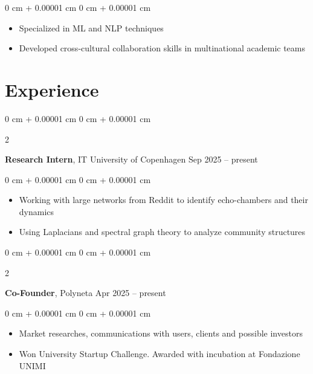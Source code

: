 \documentclass[10pt, letterpaper]{article}
\newenvironment{highlights}{
    \begin{itemize}[
        topsep=0.10 cm,
        parsep=0.10 cm,
        partopsep=0pt,
        itemsep=0pt,
        leftmargin=0 cm + 10pt
    ]
}{
    \end{itemize}
} %
\newenvironment{onecolentry}{
    \begin{adjustwidth}{
        0 cm + 0.00001 cm
    }{
        0 cm + 0.00001 cm
    }
}{
    \end{adjustwidth}
} %
\newenvironment{twocolentry}[2][]{
    \onecolentry
    \def\secondColumn{#2}
    \setcolumnwidth{\fill, 4.5 cm}
    \begin{paracol}{2}
}{
    \switchcolumn \raggedleft \secondColumn
    \end{paracol}
    \endonecolentry
} %
\begin{document}
        \vspace{0.10 cm}
        \begin{onecolentry}
            \begin{highlights}
                \item Specialized in ML and NLP techniques
                \item Developed cross-cultural collaboration skills in multinational academic teams
            \end{highlights}
        \end{onecolentry}
    
    \section{Experience}
        
        \begin{twocolentry}{
            Sep 2025 – present
        }
        \textbf{Research Intern}, IT University of Copenhagen\end{twocolentry}

        \vspace{0.10 cm}
        \begin{onecolentry}
            \begin{highlights}
                \item Working with large networks from Reddit to identify echo-chambers and their dynamics
                \item Using Laplacians and spectral graph theory to analyze community structures
            \end{highlights}
        \end{onecolentry}

        \vspace{0.2 cm}

        \begin{twocolentry}{
            Apr 2025 – present
        }
        \textbf{Co-Founder}, Polyneta\end{twocolentry}

        \vspace{0.10 cm}
        \begin{onecolentry}
            \begin{highlights}
              \item Market researches, communications with users, clients and possible investors
              \item Won University Startup Challenge. Awarded with incubation at Fondazione UNIMI
            \end{highlights}
        \end{onecolentry}
\end{document}
